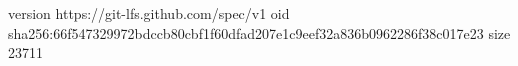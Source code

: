 version https://git-lfs.github.com/spec/v1
oid sha256:66f547329972bdccb80cbf1f60dfad207e1c9eef32a836b0962286f38c017e23
size 23711

